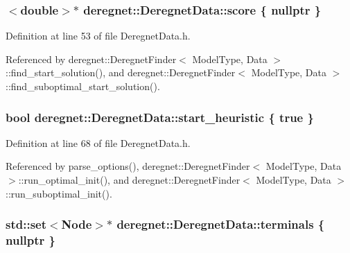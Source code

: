 \subsubsection[{\texorpdfstring{score}{score}}]{$<$double$>$$\ast$ deregnet\+::\+Deregnet\+Data\+::score \{ nullptr \}}\hypertarget{classderegnet_1_1DeregnetData_a32970c8f43eb8be313ad08d829223b1f}{}\label{classderegnet_1_1DeregnetData_a32970c8f43eb8be313ad08d829223b1f}


Definition at line 53 of file Deregnet\+Data.\+h.



Referenced by deregnet\+::\+Deregnet\+Finder$<$ Model\+Type, Data $>$\+::find\+\_\+start\+\_\+solution(), and deregnet\+::\+Deregnet\+Finder$<$ Model\+Type, Data $>$\+::find\+\_\+suboptimal\+\_\+start\+\_\+solution().

\subsubsection[{\texorpdfstring{start\+\_\+heuristic}{start_heuristic}}]{\setlength{\rightskip}{0pt plus 5cm}bool deregnet\+::\+Deregnet\+Data\+::start\+\_\+heuristic \{ true \}}\hypertarget{classderegnet_1_1DeregnetData_abac721360704af5615f7ff84b183eebd}{}\label{classderegnet_1_1DeregnetData_abac721360704af5615f7ff84b183eebd}


Definition at line 68 of file Deregnet\+Data.\+h.



Referenced by parse\+\_\+options(), deregnet\+::\+Deregnet\+Finder$<$ Model\+Type, Data $>$\+::run\+\_\+optimal\+\_\+init(), and deregnet\+::\+Deregnet\+Finder$<$ Model\+Type, Data $>$\+::run\+\_\+suboptimal\+\_\+init().

\subsubsection[{\texorpdfstring{terminals}{terminals}}]{\setlength{\rightskip}{0pt plus 5cm}std\+::set$<${\bf Node}$>$$\ast$ deregnet\+::\+Deregnet\+Data\+::terminals \{ nullptr \}}\hypertarget{classderegnet_1_1DeregnetData_a1fe559c6056cd411647f836849e4b0da}{}\label{classderegnet_1_1DeregnetData_a1fe559c6056cd411647f836849e4b0da}


